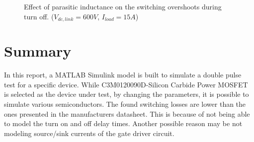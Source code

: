 \documentclass[12pt]{article} %
\begin{document}
\begin{figure}[h]
     \centering
        \caption{Effect of parasitic inductance on the switching overshoots during turn off. ($V_{dc,link}=600V$, $I_{load}=15A$)}
	\label{fig:parasiticswitching_turnoff}
\end{figure}
\clearpage
\section{Summary}

In this report, a MATLAB Simulink model is built to simulate a double pulse test for a specific device. While C3M0120090D-Silicon Carbide Power MOSFET is selected as the device under test, by changing the parameters, it is possible to simulate various semiconductors. The found switching losses are lower than the ones presented in the manufacturers datasheet. This is because of not being able to model the turn on and off delay times. Another possible reason may be not modeling source/sink currents of the gate driver circuit.



\vfill
\end{document}
